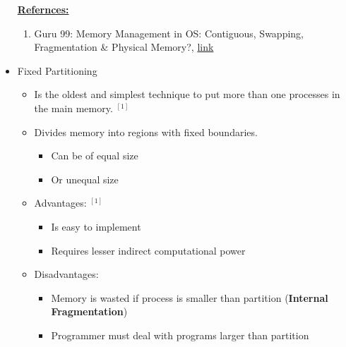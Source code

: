 \documentclass[12pt]{article}
\begin{document}
\begin{itemize}
    \underline{\textbf{Refernces:}}

    \bigskip

    \begin{enumerate}[1)]
        \item Guru 99: Memory Management in OS: Contiguous, Swapping, Fragmentation \& Physical Memory?, \href{https://www.guru99.com/os-memory-management.html#1}{link}
    \end{enumerate}
    \item Fixed Partitioning
    \begin{itemize}
        \item Is the oldest and simplest technique to put more than one processes in
        the main memory. $^{[1]}$
        \item Divides memory into regions with fixed boundaries.
        \begin{itemize}
            \item Can be of equal size
            \item Or unequal size
        \end{itemize}
        \item Advantages: $^{[1]}$
        \begin{itemize}
            \item Is easy to implement
            \item Requires lesser indirect computational power
        \end{itemize}
        \item Disadvantages:
        \begin{itemize}
            \item Memory is wasted if process is smaller than partition (\textbf{Internal Fragmentation})
            \item Programmer must deal with programs larger than partition
        \end{itemize}
    \end{itemize}


\end{itemize}
\end{document}
